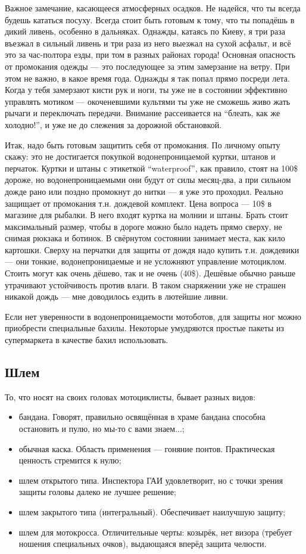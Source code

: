 \documentclass[12pt,a4paper]{article}
\begin{document}
Важное замечание, касающееся атмосферных осадков. Не надейся, что ты
всегда будешь кататься посуху. Всегда стоит быть готовым к тому, что
ты попадёшь в дикий ливень, особенно в дальняках. Однажды, катаясь
по Киеву, я три раза въезжал в сильный ливень и три раза из него выезжал
на сухой асфальт, и всё это за час-полтора езды, при том в разных
районах города! Основная опасность от промокания одежды --- это
последующее за этим замерзание на ветру. При этом не важно, в какое
время года. Однажды я так попал прямо посреди лета. Когда у тебя
замерзают кисти рук и ноги, ты уже не в состоянии эффективно управлять
мотиком --- окоченевшими культями ты уже не сможешь живо жать рычаги и
переключать передачи. Внимание рассеивается на ``блеать, как же
холодно!'', и уже не до слежения за дорожной обстановкой.

Итак, надо быть готовым защитить себя от промокания. По личному опыту
скажу: это не достигается покупкой водонепроницаемой куртки, штанов и
перчаток. Куртки и штаны с этикеткой ``waterproof'', как правило, стоят
на 100\$ дороже, но водонепроницаемыми они будут от силы месяц-два, а
при сильном дожде рано или поздно промокнут до нитки --- я уже это
проходил. Реально защищает от промокания т.н. дождевой комплект. Цена
вопроса --- 10\$ в магазине для рыбалки. В него входят куртка на
молнии и штаны. Брать стоит максимальный размер, чтобы в дороге можно
было надеть прямо сверху, не снимая рюкзака и ботинок. В свёрнутом
состоянии занимает места, как кило картошки. Сверху на перчатки для
защиты от дождя надо купить т.н. дождевики --- они тонкие,
водонепроницаемые и не усложняют управление мотоциклом. Стоить могут
как очень дёшево, так и не очень (40\$). Дешёвые обычно раньше
утрачивают устойчивость против влаги. В таком снаряжении уже не страшен
никакой дождь --- мне доводилось ездить в лютейшие ливни.

Если нет уверенности в водонепроницаемости мотоботов, для защиты ног
можно приобрести специальные бахилы. Некоторые умудряются простые
пакеты из супермаркета в качестве бахил использовать.

\subsection{Шлем}

То, что носят на своих головах мотоциклисты, бывает разных видов:

\begin{itemize}
\item бандана. Говорят, правильно освящённая в храме бандана способна
остановить и пулю, но мы-то с вами знаем...;
\item обычная каска. Область применения --- гоняние понтов. Практическая
ценность стремится к нулю;
\item шлем открытого типа. Инспектора ГАИ удовлетворит, но с точки
зрения защиты головы далеко не лучшее решение;
\item шлем закрытого типа (интегральный). Обеспечивает наилучшую защиту;
\item шлем для мотокросса. Отличительные черты: козырёк, нет визора
(требует ношения специальных очков), выдающаяся вперёд защита челюсти.
\end{itemize}
\end{document}
